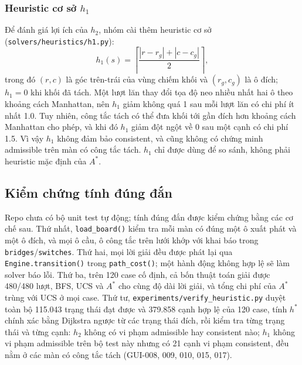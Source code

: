 \subsubsection{Heuristic cơ sở $h_1$}
Để đánh giá lợi ích của $h_2$, nhóm cài thêm heuristic cơ sở (\texttt{solvers/heuristics/h1.py}):
\begin{equation}
    h_1(s)=\left\lceil\frac{|r-r_g|+|c-c_g|}{2}\right\rceil,
    \label{eq:h1_baseline}
\end{equation}
trong đó $(r,c)$ là góc trên-trái của vùng chiếm khối và $(r_g,c_g)$ là ô đích; $h_1=0$ khi khối đã tách. Một lượt lăn thay đổi tọa độ neo nhiều nhất hai ô theo khoảng cách Manhattan, nên $h_1$ giảm không quá 1 sau mỗi lượt lăn có chi phí ít nhất 1.0. Tuy nhiên, công tắc tách có thể đưa khối tới gần đích hơn khoảng cách Manhattan cho phép, và khi đó $h_1$ giảm đột ngột về 0 sau một cạnh có chi phí 1.5. Vì vậy $h_1$ không đảm bảo consistent, và cũng không có chứng minh admissible trên màn có công tắc tách. $h_1$ chỉ được dùng để so sánh, không phải heuristic mặc định của $A^*$.

\subsection{Kiểm chứng tính đúng đắn}
Repo chưa có bộ unit test tự động; tính đúng đắn được kiểm chứng bằng các cơ chế sau. Thứ nhất, \texttt{load\_board()} kiểm tra mỗi màn có đúng một ô xuất phát và một ô đích, và mọi ô cầu, ô công tắc trên lưới khớp với khai báo trong \texttt{bridges}/\texttt{switches}. Thứ hai, mọi lời giải đều được phát lại qua \texttt{Engine.transition()} trong \texttt{path\_cost()}; một hành động không hợp lệ sẽ làm solver báo lỗi. Thứ ba, trên 120 case cố định, cả bốn thuật toán giải được 480/480 lượt, BFS, UCS và $A^*$ cho cùng độ dài lời giải, và tổng chi phí của $A^*$ trùng với UCS ở mọi case. Thứ tư, \texttt{experiments/verify\_heuristic.py} duyệt toàn bộ 115.043 trạng thái đạt được và 379.858 cạnh hợp lệ của 120 case, tính $h^*$ chính xác bằng Dijkstra ngược từ các trạng thái đích, rồi kiểm tra từng trạng thái và từng cạnh: $h_2$ không có vi phạm admissible hay consistent nào; $h_1$ không vi phạm admissible trên bộ test này nhưng có 21 cạnh vi phạm consistent, đều nằm ở các màn có công tắc tách (GUI-008, 009, 010, 015, 017).
